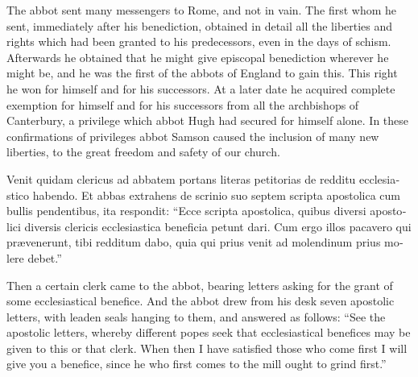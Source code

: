 \documentclass[10pt]{book}
\begin{document}
\begin{paracol}{2}
\begin{otherlanguage}{latin}
\end{otherlanguage}

\switchcolumn

The abbot sent many messengers to Rome, and not in vain. The first whom he sent, immediately after his benediction, obtained in detail all the liberties and rights which had been granted to his predecessors, even in the days of schism. Afterwards he obtained that he might give episcopal benediction wherever he might be, and he was the first of the abbots of England to gain this. This right he won for himself and for his successors. At a later date he acquired complete exemption for himself and for his successors from all the archbishops of Canterbury, a privilege which abbot Hugh had secured for himself alone. In these confirmations of privileges abbot Samson caused the inclusion of many new liberties, to the great freedom and safety of our church.

\switchcolumn*

\begin{otherlanguage}{latin}
Venit quidam clericus ad abbatem portans literas petitorias de redditu ecclesiastico habendo. Et abbas extrahens de scrinio suo septem scripta apostolica cum bullis pendentibus, ita respondit: ``Ecce scripta apostolica, quibus diversi apostolici diversis clericis ecclesiastica beneficia petunt dari. Cum ergo illos pacavero qui pr\ae{}venerunt, tibi redditum dabo, quia qui prius venit ad molendinum prius molere debet.''
\end{otherlanguage}

\switchcolumn

Then a certain clerk came to the abbot, bearing letters asking for the grant of some ecclesiastical benefice. And the abbot drew from his desk seven apostolic letters, with leaden seals hanging to them, and answered as follows: ``See the apostolic letters, whereby different popes seek that ecclesiastical benefices may be given to this or that clerk. When then I have satisfied those who come first I will give you a benefice, since he who first comes to the mill ought to grind first.''

\switchcolumn*


\end{paracol}
\end{document}
